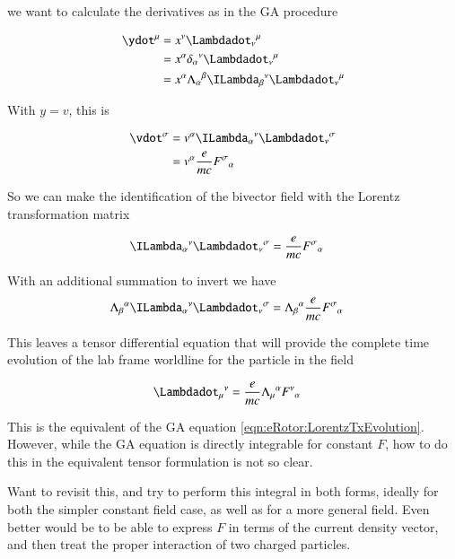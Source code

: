 we want to calculate the derivatives as in the GA procedure

\begin{align*}
\ydot^\mu 
&= x^\nu {\Lambdadot_\nu}^\mu \\
&= x^\alpha {\delta_\alpha}^\nu {\Lambdadot_\nu}^\mu \\
&= x^\alpha {\Lambda_\alpha}^\beta {\ILambda_\beta}^\nu {\Lambdadot_\nu}^\mu \\
\end{align*}

With $y = v$, this is

\begin{align*}
\vdot^\sigma 
&= v^\alpha {\ILambda_\alpha}^\nu {\Lambdadot_\nu}^\sigma \\
&= v^\alpha \frac{e}{m c} {F^\sigma}_\alpha 
\end{align*}

So we can make the identification of the bivector field with the Lorentz transformation matrix

\begin{align*}
{\ILambda_\alpha}^\nu {\Lambdadot_\nu}^\sigma &= \frac{e}{m c} {F^\sigma}_\alpha 
\end{align*}

With an additional summation to invert we have
\begin{align*}
{\Lambda_\beta}^\alpha {\ILambda_\alpha}^\nu {\Lambdadot_\nu}^\sigma &= {\Lambda_\beta}^\alpha \frac{e}{m c} {F^\sigma}_\alpha 
\end{align*}

This leaves a tensor differential equation that will provide the complete time evolution of the lab frame worldline for the particle in the field

\begin{align}
{{\Lambdadot}_\mu}^\nu &= \frac{e}{m c} {\Lambda_\mu}^\alpha {F^\nu}_\alpha 
\end{align}

This is the equivalent of the GA equation \ref{eqn:eRotor:LorentzTxEvolution}.  However, while the GA equation is directly integrable for constant $F$, how to do this in the equivalent tensor formulation is not so clear.

Want to revisit this, and try to perform this integral in both forms, ideally
for both the simpler constant field case, as well as for a more general field.
Even better would be to be able to express $F$ in terms of the current 
density vector, and then treat the proper interaction of two charged particles.

